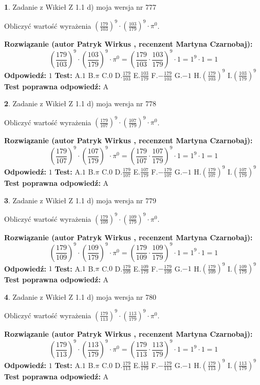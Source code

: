 \documentclass[12pt, a4paper]{article}
\theoremstyle{definition} %
\newtheorem{zad}{}
\newcommand{\zadStart}[1]{\begin{zad}#1\newline}
\newcommand{\zadStop}{\end{zad}}
\newcommand{\rozwStart}[2]{\noindent \textbf{Rozwiązanie (autor #1 , recenzent #2): }\newline}
\newcommand{\rozwStop}{\newline}
\newcommand{\odpStart}{\noindent \textbf{Odpowiedź:}\newline}
\newcommand{\odpStop}{\newline}
\newcommand{\testStart}{\noindent \textbf{Test:}\newline}
\newcommand{\testStop}{\newline}
\newcommand{\kluczStart}{\noindent \textbf{Test poprawna odpowiedź:}\newline}
\newcommand{\kluczStop}{\newline}
\begin{document}
\zadStart{Zadanie z Wikieł Z 1.1 d) moja wersja nr 777}

Obliczyć wartość wyrażenia $(\frac{179}{103})^{9} \cdot (\frac{103}{179})^{9} \cdot \pi^{0}$.
\zadStop
\rozwStart{Patryk Wirkus}{Martyna Czarnobaj}
$$(\frac{179}{103})^{9} \cdot (\frac{103}{179})^{9} \cdot \pi^{0} = (\frac{179}{103} \cdot \frac{103}{179})^{9} \cdot 1 = 1^{9} \cdot 1 = 1$$
\rozwStop
\odpStart
$1$
\odpStop
\testStart
A.$1$ B.$\pi$ C.$0$ D.$\frac{179}{103}$ E.$\frac{103}{179}$
F.$-\frac{179}{103}$ G.$-1$
H.$(\frac{179}{103})^{9}$
I.$(\frac{103}{179})^{9}$
\testStop
\kluczStart
A
\kluczStop



\zadStart{Zadanie z Wikieł Z 1.1 d) moja wersja nr 778}

Obliczyć wartość wyrażenia $(\frac{179}{107})^{9} \cdot (\frac{107}{179})^{9} \cdot \pi^{0}$.
\zadStop
\rozwStart{Patryk Wirkus}{Martyna Czarnobaj}
$$(\frac{179}{107})^{9} \cdot (\frac{107}{179})^{9} \cdot \pi^{0} = (\frac{179}{107} \cdot \frac{107}{179})^{9} \cdot 1 = 1^{9} \cdot 1 = 1$$
\rozwStop
\odpStart
$1$
\odpStop
\testStart
A.$1$ B.$\pi$ C.$0$ D.$\frac{179}{107}$ E.$\frac{107}{179}$
F.$-\frac{179}{107}$ G.$-1$
H.$(\frac{179}{107})^{9}$
I.$(\frac{107}{179})^{9}$
\testStop
\kluczStart
A
\kluczStop



\zadStart{Zadanie z Wikieł Z 1.1 d) moja wersja nr 779}

Obliczyć wartość wyrażenia $(\frac{179}{109})^{9} \cdot (\frac{109}{179})^{9} \cdot \pi^{0}$.
\zadStop
\rozwStart{Patryk Wirkus}{Martyna Czarnobaj}
$$(\frac{179}{109})^{9} \cdot (\frac{109}{179})^{9} \cdot \pi^{0} = (\frac{179}{109} \cdot \frac{109}{179})^{9} \cdot 1 = 1^{9} \cdot 1 = 1$$
\rozwStop
\odpStart
$1$
\odpStop
\testStart
A.$1$ B.$\pi$ C.$0$ D.$\frac{179}{109}$ E.$\frac{109}{179}$
F.$-\frac{179}{109}$ G.$-1$
H.$(\frac{179}{109})^{9}$
I.$(\frac{109}{179})^{9}$
\testStop
\kluczStart
A
\kluczStop



\zadStart{Zadanie z Wikieł Z 1.1 d) moja wersja nr 780}

Obliczyć wartość wyrażenia $(\frac{179}{113})^{9} \cdot (\frac{113}{179})^{9} \cdot \pi^{0}$.
\zadStop
\rozwStart{Patryk Wirkus}{Martyna Czarnobaj}
$$(\frac{179}{113})^{9} \cdot (\frac{113}{179})^{9} \cdot \pi^{0} = (\frac{179}{113} \cdot \frac{113}{179})^{9} \cdot 1 = 1^{9} \cdot 1 = 1$$
\rozwStop
\odpStart
$1$
\odpStop
\testStart
A.$1$ B.$\pi$ C.$0$ D.$\frac{179}{113}$ E.$\frac{113}{179}$
F.$-\frac{179}{113}$ G.$-1$
H.$(\frac{179}{113})^{9}$
I.$(\frac{113}{179})^{9}$
\testStop
\kluczStart
A
\kluczStop
\end{document}
